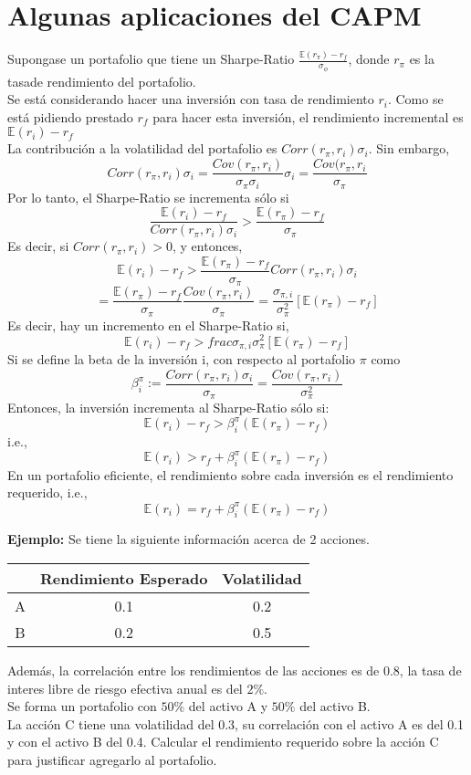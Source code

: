 \documentclass[12pts]{extarticle}
\begin{document}
\section{Algunas aplicaciones del CAPM} 
Supongase un portafolio que tiene un Sharpe-Ratio $\frac{\mathbb{E}(r_\pi)-r_f}{\sigma_\phi}$, donde $r_\pi$ es la tasade rendimiento del portafolio. \\ Se está considerando hacer una inversión con tasa de rendimiento $r_i$. Como se está pidiendo prestado 
$r_f$ para hacer esta inversión, el rendimiento incremental es $\mathbb{E}(r_i)-r_f$ \\ La contribución a la volatilidad del portafolio es $Corr(r_\pi, r_i)\sigma_i$. Sin embargo, 
$$Corr(r_\pi, r_i)\sigma_i =\frac{Cov(r_\pi, r_i)}{\sigma_\pi \sigma_i}\sigma_i = \frac{Cov(r_\pi, r_i}{\sigma_\pi}$$ 
Por lo tanto, el Sharpe-Ratio se incrementa sólo si $$\frac{\mathbb{E}(r_i)-r_f}{Corr(r_\pi, r_i)\sigma_i}>\frac{\mathbb{E}(r_\pi)-r_f}{\sigma_\pi}$$
Es decir, si $Corr(r_\pi, r_i)>0$, y entonces, 
$$\mathbb{E}(r_i)-r_f>\frac{\mathbb{E}(r_\pi)-r_f}{\sigma_\pi}Corr(r_\pi, r_i)\sigma_i$$ 
$$=\frac{\mathbb{E}(r_\pi)-r_f}{\sigma_\pi} \frac{Cov(r_\pi, r_i)}{\sigma_\pi}=\frac{\sigma_{\pi, i}}{\sigma_\pi^2}[\mathbb{E}(r_\pi)-r_f]$$
Es decir, hay un incremento en el Sharpe-Ratio si, 
$$\mathbb{E}(r_i)-r_f>frac{\sigma_{\pi, i}}{\sigma_\pi^2}[\mathbb{E}(r_\pi)-r_f]$$
Si se define la beta de la inversión i, con respecto al portafolio $\pi$ como 
$$\beta_i^\pi:=\frac{Corr(r_\pi, r_i)\sigma_i}{\sigma_\pi}=\frac{Cov(r_\pi,r_i)}{\sigma_\pi^2}$$
Entonces, la inversión incrementa al Sharpe-Ratio sólo si: 
$$\mathbb{E}(r_i)-r_f>\beta_i^\pi(\mathbb{E}(r_\pi)-r_f)$$ 
i.e., 
$$\mathbb{E}(r_i)>r_f + \beta_i^\pi(\mathbb{E}(r_\pi)-r_f)$$
En un portafolio eficiente, el rendimiento sobre cada inversión es el rendimiento requerido, i.e., 
$$\mathbb{E}(r_i)=r_f + \beta_i^\pi(\mathbb{E}(r_\pi)-r_f)$$

\textbf{Ejemplo:} Se tiene la siguiente información acerca de 2 acciones. 
\begin{center}
 \begin{tabular}{||c c c ||} 
 \hline
  & Rendimiento Esperado & Volatilidad \\ [0.5ex] 
 \hline\hline
 A & 0.1 &0.2 \\ 
 \hline
 B & 0.2 & 0.5\\ 
 \hline
\end{tabular}
\end{center}
Además, la correlación entre los rendimientos de las acciones es de 0.8, la tasa de interes libre de riesgo efectiva anual es del $2\%$. \\ Se forma un portafolio con $50\%$ del activo A y $50\%$ del activo B. \\La acción C tiene una volatilidad del 0.3, su correlación con el activo A es del 0.1 y con el activo B del 0.4. Calcular el rendimiento requerido sobre la acción C para justificar agregarlo al portafolio. 
\end{document}
